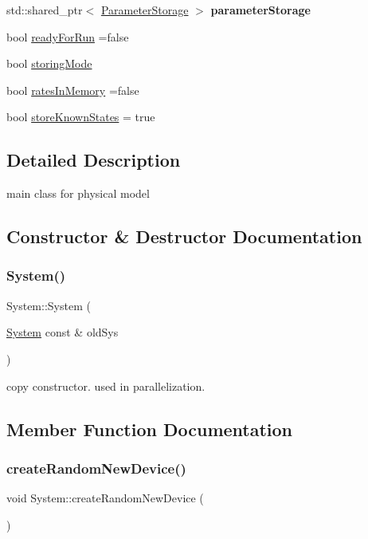 \begin{DoxyCompactItemize}
std\+::shared\+\_\+ptr$<$ \hyperlink{classParameterStorage}{Parameter\+Storage} $>$ {\bfseries parameter\+Storage}
\item 
bool \hyperlink{classSystem_a0d59e20f6ebffb9b2b6e31f7e85d1756}{ready\+For\+Run} =false
\item 
bool \hyperlink{classSystem_afe51eb9409a63748242e0a987c98caf0}{storing\+Mode}
\item 
bool \hyperlink{classSystem_abdb9c2321ac8dbfc6a5febc07ae4def9}{rates\+In\+Memory} =false
\item 
bool \hyperlink{classSystem_aa121c1c34382800d39106aa81d9c36f4}{store\+Known\+States} = true
\end{DoxyCompactItemize}


\subsection{Detailed Description}
main class for physical model 

\subsection{Constructor \& Destructor Documentation}
\mbox{\label{classSystem_afe81cf1082ba164e244acfb72735b753}} 
\subsubsection{\texorpdfstring{System()}{System()}}
{\footnotesize\ttfamily System\+::\+System (\begin{DoxyParamCaption}\item[{\hyperlink{classSystem}{System} const \&}]{old\+Sys }\end{DoxyParamCaption})}

copy constructor. used in parallelization. 

\subsection{Member Function Documentation}
\mbox{\label{classSystem_a5ce3d5c7024ac817ab218b65d96ed1eb}} 
\subsubsection{\texorpdfstring{create\+Random\+New\+Device()}{createRandomNewDevice()}}
{\footnotesize\ttfamily void System\+::create\+Random\+New\+Device (\begin{DoxyParamCaption}{ }\end{DoxyParamCaption})}

